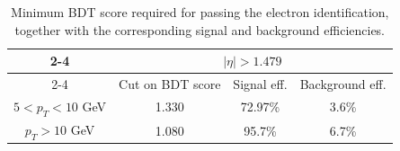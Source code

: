 \begin{table}[h!]
\begin{tabular}{|c|c c c}
\cline{2-4}
  \multicolumn{1}{ c|}{}             & \multicolumn{3}{|c|}{$|\eta| > 1.479$}                        \\            
\cline{2-4} %
   \multicolumn{1}{c|}{}            & Cut on BDT score & Signal eff. & \multicolumn{1}{c|}{Background eff.}  \\
\hline  %
$ 5 < p_T < 10 $ GeV              & 1.330                     & 72.97\%    &  \multicolumn{1}{c|}{3.6\%}     \\
\hline %
$p_T > 10$ GeV                      &  1.080		         & 95.7\%      &  \multicolumn{1}{c|}{6.7\%}		\\
\hline %

     \end{tabular}
\small
    \caption{Minimum BDT score required for passing the electron identification, together with the corresponding signal and background efficiencies.}%
    \label{tab:ele_ID_WP}
\end{table}

